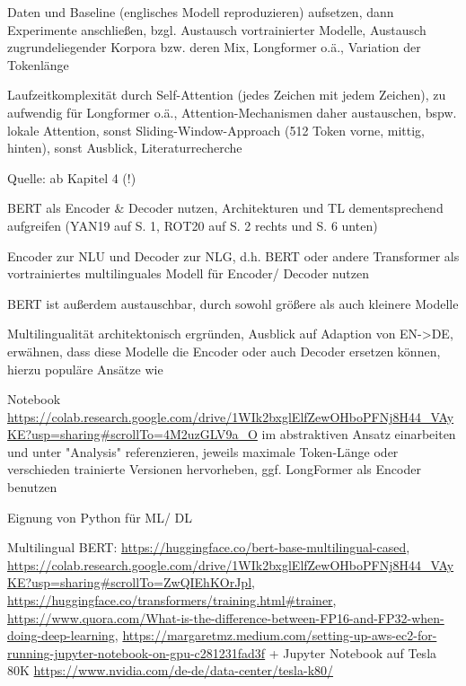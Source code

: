 Daten und Baseline (englisches Modell reproduzieren) aufsetzen, dann Experimente anschließen, bzgl. Austausch vortrainierter Modelle, Austausch zugrundeliegender Korpora bzw. deren Mix, Longformer o.ä., Variation der Tokenlänge

Laufzeitkomplexität durch Self-Attention (jedes Zeichen mit jedem Zeichen), zu aufwendig für Longformer o.ä., Attention-Mechanismen daher austauschen, bspw. lokale Attention, sonst Sliding-Window-Approach (512 Token vorne, mittig, hinten), sonst Ausblick, Literaturrecherche

Quelle: \cite{NIT19} ab Kapitel 4 (!)

BERT als Encoder \& Decoder nutzen, Architekturen und TL dementsprechend aufgreifen (YAN19 auf S. 1, ROT20 auf S. 2 rechts und S. 6 unten)

Encoder zur NLU und Decoder zur NLG, d.h. BERT oder andere Transformer als vortrainiertes multilinguales Modell für Encoder/ Decoder nutzen

BERT ist außerdem austauschbar, durch sowohl größere als auch kleinere Modelle

Multilingualität architektonisch ergründen, Ausblick auf Adaption von EN->DE, erwähnen, dass diese Modelle die Encoder oder auch Decoder ersetzen können, hierzu populäre Ansätze wie \cite{ROT20}

Notebook \url{https://colab.research.google.com/drive/1WIk2bxglElfZewOHboPFNj8H44_VAyKE?usp=sharing#scrollTo=4M2uzGLV9a_O} im abstraktiven Ansatz einarbeiten und unter "Analysis" referenzieren, jeweils maximale Token-Länge oder verschieden trainierte Versionen hervorheben, ggf. LongFormer als Encoder benutzen

Eignung von Python für ML/ DL

Multilingual BERT: \url{https://huggingface.co/bert-base-multilingual-cased}, \url{https://colab.research.google.com/drive/1WIk2bxglElfZewOHboPFNj8H44_VAyKE?usp=sharing#scrollTo=ZwQIEhKOrJpl}, \url{https://huggingface.co/transformers/training.html#trainer}, \url{https://www.quora.com/What-is-the-difference-between-FP16-and-FP32-when-doing-deep-learning}, \url{https://margaretmz.medium.com/setting-up-aws-ec2-for-running-jupyter-notebook-on-gpu-c281231fad3f} + Jupyter Notebook auf Tesla 80K \url{https://www.nvidia.com/de-de/data-center/tesla-k80/}

